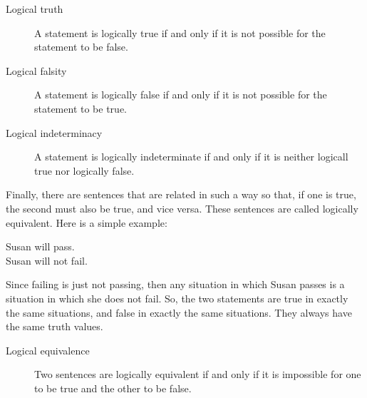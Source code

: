 \documentclass[../logic-text.tex]{subfiles}
\begin{document}
\begin{description}
  \item[Logical truth] A statement is logically true if and only if it is not possible for the statement to be false.
  \item[Logical falsity] A statement is logically false if and only if it is not possible for the statement to be true.
  \item[Logical indeterminacy] A statement is logically indeterminate if and only if it is neither logicall true nor logically false.
\end{description}

Finally, there are sentences that are related in such a way so that, if one is true, the second must also be true, and vice versa. These sentences are called logically equivalent. Here is a simple example:

\medskip

\noindent Susan will pass.\\
Susan will not fail.

\medskip

Since failing is just not passing, then any situation in which Susan passes is a situation in which she does not fail. So, the two statements are true in exactly the same situations, and false in exactly the same situations. They always have the same truth values.

\begin{description}
  \item[Logical equivalence]  Two sentences are logically equivalent if and only if it is impossible for one to be true and the other to be false.
\end{description}
\end{document}

